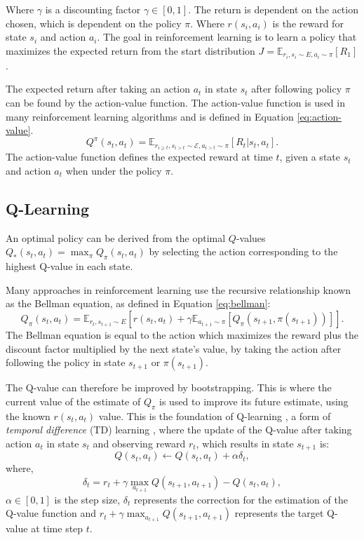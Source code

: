 Where $\gamma$ is a discounting factor $\gamma \in [0,1]$. The return is dependent on the action chosen, which is dependent on the policy $\pi$. Where $r(s_i, a_i)$ is the reward for state $s_i$ and action $a_i$. The goal in reinforcement learning is to learn a policy that maximizes the expected return from the start distribution $J=\mathbb{E}_{r_i,s_i \sim E,a_i \sim \pi}[R_1]$. 

The expected return after taking an action $a_t$ in state $s_t$ after following policy $\pi$ can be found by the action-value function. The action-value function is used in many reinforcement learning algorithms and is defined in Equation \ref{eq:action-value}.
\begin{equation}
\label{eq:action-value}
Q^{\pi}(s_t,a_t)=\mathbb{E}_{r_{i\geq t},s_{i>t}\sim \mathcal{E},a_{i>t}\sim\pi}[R_t|s_t,a_t].
\end{equation}
\noindent The action-value function defines the expected reward at time $t$, given a state $s_t$ and action $a_t$ when under the policy $\pi$.

\subsection{Q-Learning}

An optimal policy can be derived from the optimal $Q$-values $Q_*(s_t,a_t)=\max_\pi Q_\pi(s_t,a_t)$ by selecting the action corresponding to the highest Q-value in each state.

Many approaches in reinforcement learning use the recursive relationship known as the Bellman equation, as defined in Equation \ref{eq:bellman}:
\begin{dmath}
	\label{eq:bellman}
	Q_\pi(s_t,a_t)=\mathbb{E}_{{r_t},s_{t+1}\sim E} [r(s_t,a_t)+
	\gamma\mathbb{E}_{a_{t+1}\sim \pi}[Q_\pi(s_{t+1},\pi(s_{t+1}))]].
\end{dmath}
\noindent The Bellman equation is equal to the action which maximizes the reward plus the discount factor multiplied by the next state's value, by taking the action after following the policy in state $s_{t+1}$ or $\pi(s_{t+1})$.

The Q-value can therefore be improved by bootstrapping. This is where the current value of the estimate of $Q_\pi$ is used to improve its future estimate, using the known $r(s_t,a_t)$ value. This is the foundation of Q-learning \cite{Gay2007}, a form of \textit{temporal difference} (TD) learning \cite{Sutton2015}, where the update of the Q-value after taking action $a_t$ in state $s_t$ and observing reward $r_t$, which results in state $s_{t+1}$ is:
\begin{equation}
Q(s_t,a_t)\leftarrow Q(s_t,a_t)+\alpha\delta_t,
\end{equation}
\noindent where,
\begin{equation}
\delta_t=r_t+\gamma\max_{a_{t+1}}Q(s_{t+1},a_{t+1})-Q(s_{t},a_t),
\end{equation}
\noindent $\alpha\in [0,1]$ is the step size, $\delta_t$ represents the correction for the estimation of the Q-value function and $r_t+\gamma\max_{a_{t+1}}Q(s_{t+1},a_{t+1})$ represents the target Q-value at time step $t$.	



